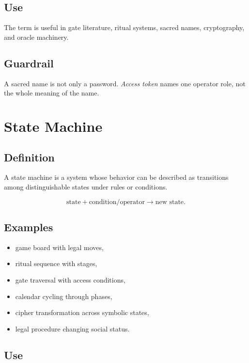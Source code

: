 \documentclass[11pt]{book}
\begin{document}
\subsection*{Use}

The term is useful in gate literature, ritual systems, sacred names, cryptography, and oracle machinery.

\subsection*{Guardrail}

A sacred name is not only a password. \emph{Access token} names one operator role, not the whole meaning of the name.

\section{State Machine}

\subsection*{Definition}

A state machine is a system whose behavior can be described as transitions among distinguishable states under rules or conditions.

\[
\text{state} + \text{condition/operator} \rightarrow \text{new state}.
\]

\subsection*{Examples}

\begin{itemize}
    \item game board with legal moves,
    \item ritual sequence with stages,
    \item gate traversal with access conditions,
    \item calendar cycling through phases,
    \item cipher transformation across symbolic states,
    \item legal procedure changing social status.
\end{itemize}

\subsection*{Use}
\end{document}

